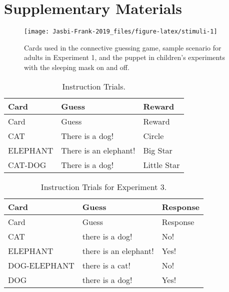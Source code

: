 \documentclass[,man,floatsintext]{apa6}
\begin{document}
\hypertarget{supplementary-materials}{%
\section{Supplementary Materials}\label{supplementary-materials}}

\begin{figure}

{\centering \texttt{[image: Jasbi-Frank-2019\_files/figure-latex/stimuli-1]} 

}

\caption{Cards used in the connective guessing game, sample scenario for adults in Experiment 1, and the puppet in children's experiments with the sleeping mask on and off.}\label{fig:stimuli}
\end{figure}

\begin{longtable}[]{@{}lll@{}}
\caption{\label{tab:instruction} Instruction Trials.}\tabularnewline
\toprule
Card & Guess & Reward\tabularnewline
\midrule
\endfirsthead
\toprule
Card & Guess & Reward\tabularnewline
\midrule
\endhead
CAT & There is a dog! & Circle\tabularnewline
ELEPHANT & There is an elephant! & Big Star\tabularnewline
CAT-DOG & There is a dog! & Little Star\tabularnewline
\bottomrule
\end{longtable}

\begin{longtable}[]{@{}lll@{}}
\caption{\label{tab:instructionStudy3} Instruction Trials for Experiment 3.}\tabularnewline
\toprule
Card & Guess & Response\tabularnewline
\midrule
\endfirsthead
\toprule
Card & Guess & Response\tabularnewline
\midrule
\endhead
CAT & there is a dog! & No!\tabularnewline
ELEPHANT & there is an elephant! & Yes!\tabularnewline
DOG-ELEPHANT & there is a cat! & No!\tabularnewline
DOG & there is a dog! & Yes!\tabularnewline
\bottomrule
\end{longtable}
\end{document}
